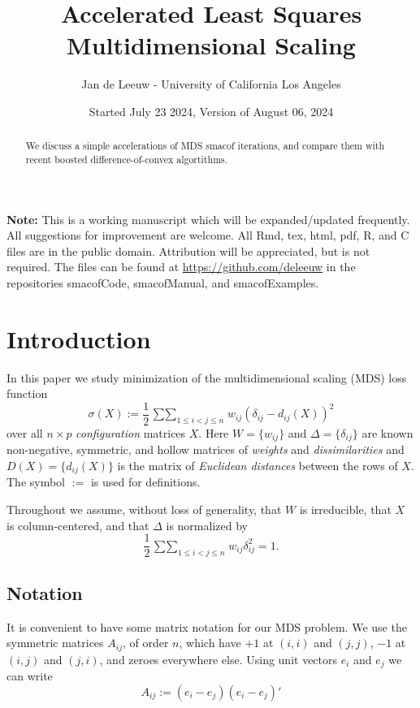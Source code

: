 \documentclass[
  12pt,
]{article}
\title{Accelerated Least Squares Multidimensional Scaling}
\author{Jan de Leeuw - University of California Los Angeles}
\date{Started July 23 2024, Version of August 06, 2024}
\begin{document}
\maketitle
\begin{abstract}
We discuss a simple accelerations of MDS smacof iterations, and compare them with recent boosted difference-of-convex algortithms.
\end{abstract}

{
\setcounter{tocdepth}{3}
\tableofcontents
}
\textbf{Note:} This is a working manuscript which will be expanded/updated
frequently. All suggestions for improvement are welcome. All Rmd, tex,
html, pdf, R, and C files are in the public domain. Attribution will be
appreciated, but is not required. The files can be found at
\url{https://github.com/deleeuw} in the repositories smacofCode, smacofManual,
and smacofExamples.

\section{Introduction}\label{introduction}

In this paper we study minimization of the multidimensional scaling (MDS) loss function
\begin{equation}
\sigma(X):=\frac12\mathop{\sum\sum}_{1\leq i<j\leq n} w_{ij}(\delta_{ij}-d_{ij}(X))^2
\label{eq:sdef}
\end{equation}
over all \(n\times p\) \emph{configuration} matrices \(X\). Here \(W=\{w_{ij}\}\) and \(\Delta=\{\delta_{ij}\}\) are known non-negative, symmetric, and hollow matrices of \emph{weights} and \emph{dissimilarities} and \(D(X)=\{d_{ij}(X)\}\) is the matrix of \emph{Euclidean distances} between the rows of \(X\). The symbol \(:=\) is used for definitions.

Throughout we assume, without loss of generality, that \(W\) is irreducible, that \(X\) is column-centered, and that \(\Delta\) is normalized by
\begin{equation}
\frac12\mathop{\sum\sum}_{1\leq i<j\leq n} w_{ij}\delta_{ij}^2=1.
\label{eq:delnorm}
\end{equation}

\subsection{Notation}\label{notation}

It is convenient to have some matrix notation for our MDS problem.
We use the symmetric matrices \(A_{ij}\), of order \(n\), which have \(+1\) at \((i,i)\) and \((j,j)\), \(-1\) at \((i,j)\) and \((j,i)\), and zeroes everywhere else. Using unit vectors \(e_i\) and \(e_j\) we can write
\begin{equation}
A_{ij}:=(e_i-e_j)(e_i-e_j)'
\label{eq:adef}
\end{equation}
\end{document}
